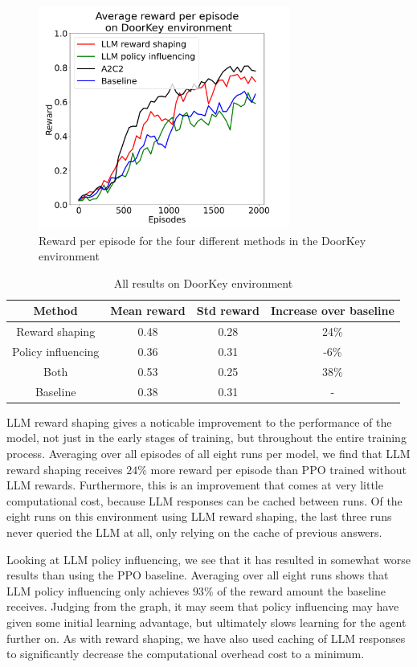 \documentclass[conference]{IEEEtran}
\begin{document}
\begin{figure}[h]
\centerline{\includegraphics[width=3.25in]{figure/doorkeyresults.png}}
\caption{Reward per episode for the four different methods in the DoorKey environment}
\label{doorkeyresults}
\end{figure}

\begin{table}[h]
\caption{All results on DoorKey environment}
\begin{center}
\label{doorkeytable}
\begin{tabular}{c | c c c}
Method & Mean reward & Std reward & Increase over baseline \\
\hline
Reward shaping & 0.48 & 0.28 & 24\% \\
Policy influencing & 0.36 & 0.31 & -6\% \\
Both & 0.53 & 0.25 & 38\% \\
Baseline & 0.38 & 0.31 & - \\
\end{tabular}
\end{center}
\end{table}

LLM reward shaping gives a noticable improvement to the performance of the model, not just in the early stages of training, but throughout the entire training process. Averaging over all episodes of all eight runs per model, we find that LLM reward shaping receives $24\%$ more reward per episode than PPO trained without LLM rewards. Furthermore, this is an improvement that comes at very little computational cost, because LLM responses can be cached between runs. Of the eight runs on this environment using LLM reward shaping, the last three runs never queried the LLM at all, only relying on the cache of previous answers.

Looking at LLM policy influencing, we see that it has resulted in somewhat worse results than using the PPO baseline. Averaging over all eight runs shows that LLM policy influencing only achieves $93\%$ of the reward amount the baseline receives. Judging from the graph, it may seem that policy influencing may have given some initial learning advantage, but ultimately slows learning for the agent further on. As with reward shaping, we have also used caching of LLM responses to significantly decrease the computational overhead cost to a minimum. 
\end{document}
